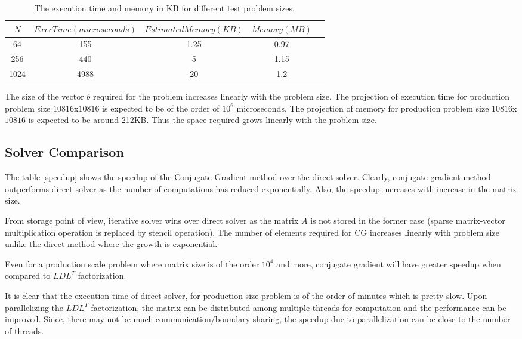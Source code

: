 \documentclass{article}
\begin{document}
\begin{spacing}{1.1}
\begin{table}[H]
\begin{center}
 \begin{tabular}{| c | c|c|c|c|} 
 \hline
$N$ & $ExecTime (microseconds)$  & $Estimated Memory (KB)$ & $Memory (MB)$ \\ %
 \hline
64 & 155 &  1.25 & 0.97\\ %
256 &  440 & 5 & 1.15\\ %
1024 &  4988 & 20 & 1.2\\ %
 \hline
\end{tabular}%
\end{center}
\caption{\label{exec_iter} The execution time and memory in KB for different test problem sizes.  } 
\end{table}

The size of the vector $b$ required for the problem increases linearly with the problem size.
The projection of execution time for production problem size $10816$x$10816$ is expected to be of the order of $10^6$ microseconds. The projection of memory for production problem size $10816$x$10816$ is expected to be around 212KB. Thus the space required grows linearly with the problem size. 


\subsection{Solver Comparison}
The table \ref{speedup} shows the speedup of the Conjugate Gradient method over the direct solver. Clearly, conjugate gradient method outperforms direct solver as the number of computations has reduced exponentially. Also, the speedup increases with increase in the matrix size.

From storage point of view, iterative solver wins over direct solver as the matrix $A$ is not stored in the former case (sparse matrix-vector multiplication operation is replaced by stencil operation). The number of elements required for CG increases linearly with problem size unlike the direct method where the growth is exponential.

Even for a production scale problem where matrix size is of the order $10^4$ and more, conjugate gradient will have greater speedup when compared to $LDL^T$ factorization.

It is clear that the execution time of direct solver, for production size problem is of the order of minutes which is pretty slow. Upon parallelizing the $LDL^T$ factorization, the matrix can be distributed among multiple threads for computation and the performance can be improved. Since, there may not be much communication/boundary sharing, the speedup due to parallelization can be close to the number of threads.


\end{spacing}
\end{document}
